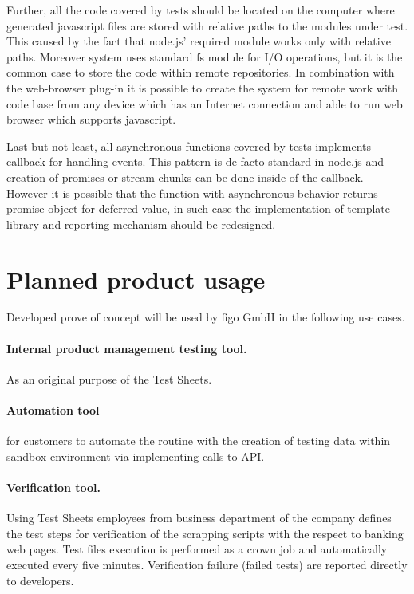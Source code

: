 Further, all the code covered by tests should be located on the computer where generated javascript files are stored with relative paths to the modules under test. This caused by the fact that node.js' required module works only with relative paths. Moreover system uses standard fs module for I/O operations, but it is the common case to store the code within remote repositories. In combination with the web-browser plug-in it is possible to create the system for remote work with code base from any device which has an Internet connection and able to run web browser which supports javascript.

Last but not least, all asynchronous functions covered by tests implements callback for handling events. This pattern is de facto standard in node.js and creation of promises or stream chunks can be done inside of the callback. However it is possible that the function with asynchronous behavior returns promise object for deferred value, in such case the implementation of template library and reporting mechanism should be redesigned.

\section{Planned product usage}
Developed prove of concept will be used by figo GmbH in the following use cases.

\paragraph{Internal product management testing tool.} As an original purpose of the Test Sheets.
\paragraph{Automation tool} for customers to automate the routine with the creation of testing data within sandbox environment via implementing calls to API.
\paragraph{Verification tool.} Using Test Sheets employees from business department of the company defines the test steps for verification of the scrapping scripts with the respect to banking web pages. Test files execution is performed as a crown job and automatically executed every five minutes. Verification failure (failed tests) are reported directly to developers.




